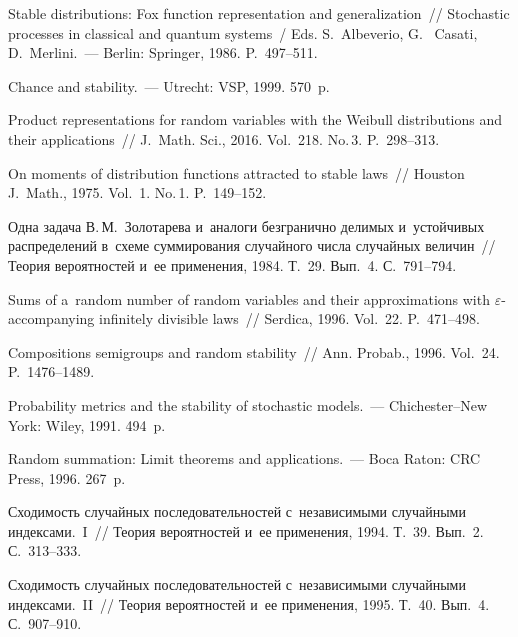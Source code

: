 \begin{multicols}{2}
{{\begin{thebibliography}{99}
 Stable distributions: Fox function representation and 
generalization~// Stochastic processes in classical and quantum systems~/ 
Eds. S.~Albeverio, G.~ Casati, D.~Merlini.~--- Berlin: Springer, 1986. P.~497--511.

 Chance and stability.~--- Utrecht: VSP, 1999.
570~p.

 Product representations for random variables with the
 Weibull distributions and their applications~// J.~Math. Sci., 2016. Vol.~218. No.\,3. P.~298--313.

 On moments of distribution functions attracted to stable laws~// 
Houston J.~Math., 1975. Vol.~1. No.\,1. P.~149--152.

 Одна задача В.\,М.~Золотарева 
и~аналоги безгранично делимых и~устойчивых распределений в~схеме суммирования 
случайного числа случайных величин~// Теория вероятностей и~ее применения, 1984. 
Т.~29. Вып.~4. С.~791--794.

 Sums of a~random number of random variables 
and their approximations with $\varepsilon$-accompanying infinitely divisible laws~// 
Serdica, 1996. Vol.~22. P.~471--498.

 Compositions semigroups and random stability~// 
Ann. Probab., 1996. Vol.~24. P.~1476--1489.


 Probability metrics and the stability of stochastic models.~--- 
 Chichester--New York: Wiley, 1991. 494~p.
 
 \pagebreak

 Random summation: Limit theorems and 
applications.~--- Boca Raton: CRC Press, 1996. 267~p.

 Сходимость случайных последовательностей с~независимыми случайными 
индексами.~I~// Теория вероятностей и~ее применения, 1994. Т.~39. Вып.~2. С.~313--333.

 Сходимость случайных последовательностей с~независимыми 
случайными индексами.~II~// Теория вероятностей и~ее применения, 1995. Т.~40. Вып.~4. С.~907--910.


\end{thebibliography}}}
\end{multicols}
